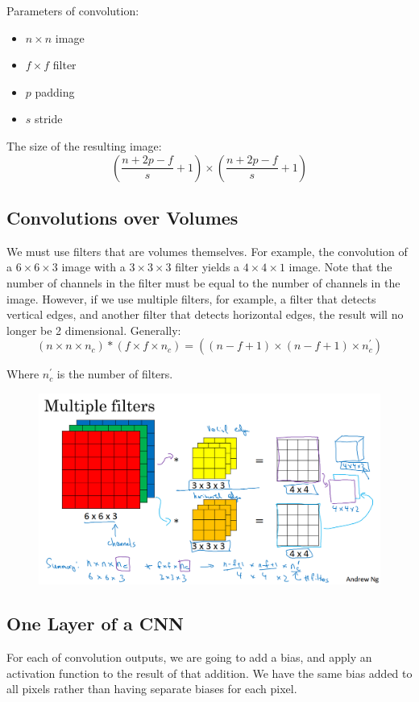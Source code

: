 Parameters of convolution: 
\begin{itemize}
    \item $n\times n$ image
    \item $f\times f$ filter
    \item $p$ padding
    \item $s$ stride
\end{itemize}

The size of the resulting image: 
$$
(\frac{n+2p-f}{s} + 1) \times (\frac{n+2p-f}{s} + 1)
$$

\subsection{Convolutions over Volumes}

We must use filters that are volumes themselves. For example, 
the convolution of a $6\times 6\times 3$ image with 
a $3\times 3\times 3$ filter yields a $4\times 4\times 1$ image. 
Note that the number of channels in the filter must be equal to 
the number of channels in the image. 
However, if we use multiple filters, for example, a filter that
detects vertical edges, and another filter that detects horizontal edges, 
the result will no longer be 2 dimensional. Generally: 
$$
(n\times n\times n_c) * (f\times f\times n_c) = ((n-f+1)\times (n-f+1)\times n_c^{'})
$$

Where $n_c^{'}$ is the number of filters. 

\begin{figure}[H]
    \includegraphics[scale=0.27]{images/volumes.png}
    \centering
\end{figure}

\subsection{One Layer of a CNN}
For each of convolution outputs, we are going to add a bias, 
and apply an activation function to the result of that addition. 
We have the same bias added to all pixels rather than 
having separate biases for each pixel. 

